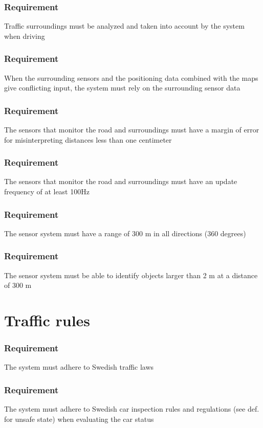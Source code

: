 \documentclass{article}
\begin{document}
{      \subsubsection{Requirement}
\hfill \break 
\- \- \-Traffic surroundings must be analyzed and taken into account by the system when driving
      \subsubsection{Requirement}
\hfill \break 
\- \- \-When the surrounding sensors and the positioning data combined with the maps give conflicting input, the system must rely on the surrounding sensor data
      \subsubsection{Requirement}
\hfill \break 
\- \- \-The sensors that monitor the road and surroundings must have a margin of error for misinterpreting distances less than one centimeter
      \subsubsection{Requirement}
\hfill \break 
\- \- \-The sensors that monitor the road and surroundings must have an update frequency of at least 100Hz
      \subsubsection{Requirement}
\hfill \break 
\- \- \-The sensor system must have a range of 300 m in all directions (360 degrees)
      \subsubsection{Requirement}
\hfill \break 
\- \- \-The sensor system must be able to identify objects larger than 2 m at a distance of 300 m
      
\section{Traffic rules}
    \subsubsection{Requirement}
\hfill \break 
\- \- \-The system must adhere to Swedish traffic laws
    \subsubsection{Requirement}
\hfill \break 
\- \- \-The system must adhere to Swedish car inspection rules and regulations (see def. for unsafe state) when evaluating the car status
}
\end{document}
